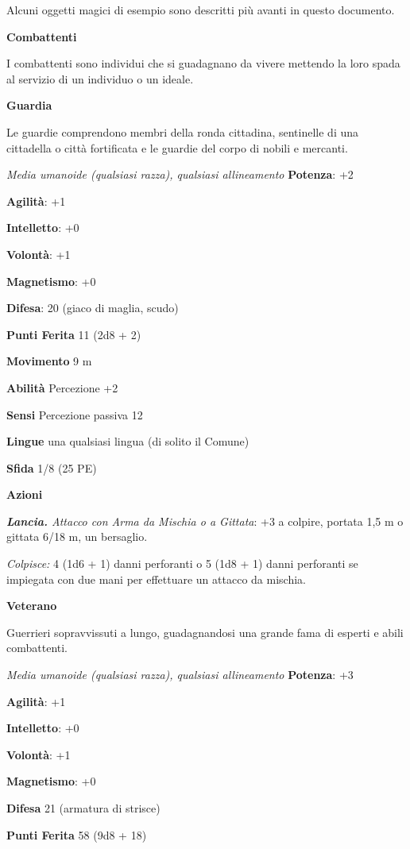 \begin{multicols}{2}
Alcuni oggetti magici di esempio sono descritti più avanti in questo
documento.

\textbf{Combattenti}

I combattenti sono individui che si guadagnano da vivere mettendo la
loro spada al servizio di un individuo o un ideale.

\textbf{Guardia}

Le guardie comprendono membri della ronda cittadina, sentinelle di una
cittadella o città fortificata e le guardie del corpo di nobili e
mercanti.

\emph{Media umanoide (qualsiasi razza), qualsiasi allineamento}
\textbf{Potenza}: +2

\textbf{Agilità}: +1

\textbf{Intelletto}: +0

\textbf{Volontà}: +1

\textbf{Magnetismo}: +0

\textbf{Difesa}: 20 (giaco di maglia, scudo)

\textbf{Punti Ferita} 11 (2d8 + 2)

\textbf{Movimento} 9 m

\textbf{Abilità} Percezione +2

\textbf{Sensi} Percezione passiva 12

\textbf{Lingue} una qualsiasi lingua (di solito il Comune)

\textbf{Sfida} 1/8 (25 PE)

\textbf{Azioni}

\emph{\textbf{Lancia.} Attacco con Arma da Mischia o a Gittata}: +3 a
colpire, portata 1,5 m o gittata 6/18 m, un bersaglio.

\emph{Colpisce:} 4 (1d6 + 1) danni perforanti o 5 (1d8 + 1) danni
perforanti se impiegata con due mani per effettuare un attacco da
mischia.

\textbf{Veterano}

Guerrieri sopravvissuti a lungo, guadagnandosi una grande fama di
esperti e abili combattenti.

\emph{Media umanoide (qualsiasi razza), qualsiasi allineamento}
\textbf{Potenza}: +3

\textbf{Agilità}: +1

\textbf{Intelletto}: +0

\textbf{Volontà}: +1

\textbf{Magnetismo}: +0

\textbf{Difesa} 21 (armatura di strisce)

\textbf{Punti Ferita} 58 (9d8 + 18)


\end{multicols}
